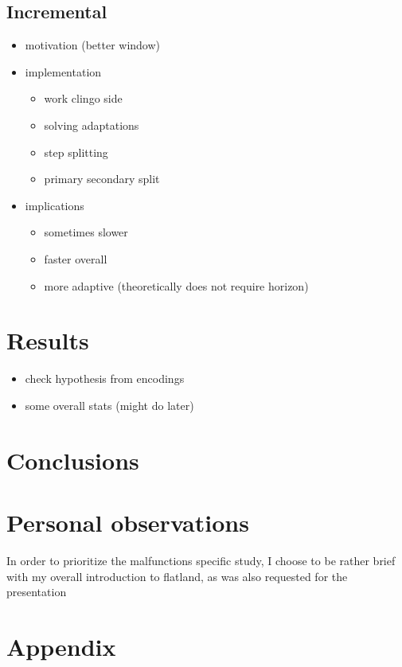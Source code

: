 \documentclass{llncs}
\begin{document}
\subsection{Incremental}
\color{blue}
\begin{itemize}
	\item motivation (better window)
	\item implementation
	\begin{itemize}
		\item work clingo side
		\item solving adaptations
		\item step splitting
		\item primary secondary split
	\end{itemize}
	\item implications
	\begin{itemize}
		\item sometimes slower
		\item faster overall
		\item more adaptive (theoretically does not require horizon)
	\end{itemize}
\end{itemize}
\color{black}


\section{Results}
\color{blue}
\begin{itemize}
	\item check hypothesis from encodings
	\item some overall stats (might do later)
\end{itemize}
\color{black}


\section{Conclusions}


\section{Personal observations}
In order to prioritize the malfunctions specific study, I choose to be rather brief with my overall introduction to flatland, as was also requested for the presentation



{}


\appendix
\clearpage
\section{Appendix}
\label{sec:appendix}
\end{document}
